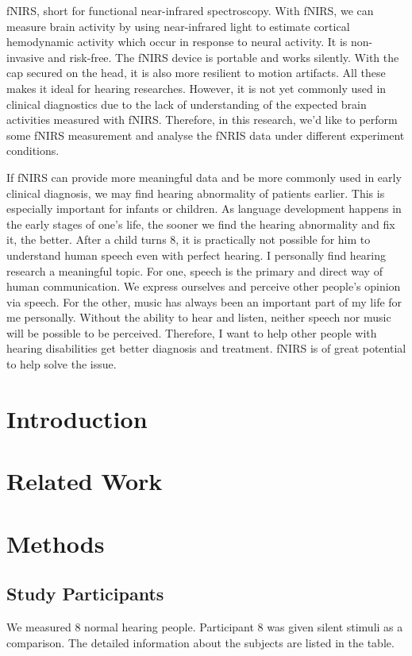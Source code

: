 \documentclass[a4paper, 12pt, twoside]{report}
\begin{document}
fNIRS,  short for functional near-infrared spectroscopy. With fNIRS, we can measure brain activity by using near-infrared light to estimate cortical hemodynamic activity which occur in response to neural activity. It is non-invasive and risk-free. The fNIRS device is portable and works silently. With the cap secured on the head, it is also more resilient to motion artifacts. All these makes it ideal for hearing researches. However, it is not yet commonly used in clinical diagnostics due to the lack of understanding of the expected brain activities measured with fNIRS. Therefore, in this research, we'd like to perform some fNIRS measurement and analyse the fNRIS data under different experiment conditions.

If fNIRS can provide more meaningful data and be more commonly used in early clinical diagnosis, we may find hearing abnormality of patients earlier. This is especially important for infants or children. As language development happens in the early stages of one's life, the sooner we find the hearing abnormality and fix it, the better. After a child turns 8, it is practically not possible for him to understand human speech even with perfect hearing. I personally find hearing research a meaningful topic. For one, speech is the primary and direct way of human communication. We express ourselves and perceive other people's opinion via speech. For the other, music has always been an important part of my life for me personally. Without the ability to hear and listen, neither speech nor music will be possible to be perceived. Therefore, I want to help other people with hearing disabilities get better diagnosis and treatment. fNIRS is of great potential to help solve the issue.


\chapter{Introduction}
\chapter{Related Work}
\chapter{Methods}
\section {Study Participants}
We measured 8 normal hearing people. Participant 8 was given silent stimuli as a comparison. The detailed information about the subjects are listed in the table.
\end{document}
